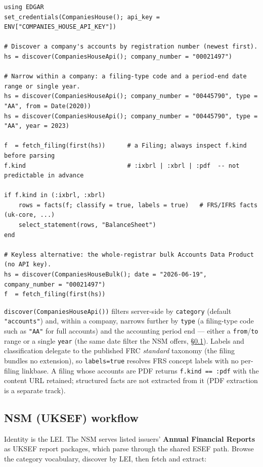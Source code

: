 \documentclass[11pt,a4paper]{report}
\begin{document}
\begin{lstlisting}
using EDGAR
set_credentials(CompaniesHouse(); api_key = ENV["COMPANIES_HOUSE_API_KEY"])

# Discover a company's accounts by registration number (newest first).
hs = discover(CompaniesHouseApi(); company_number = "00021497")

# Narrow within a company: a filing-type code and a period-end date range or single year.
hs = discover(CompaniesHouseApi(); company_number = "00445790", type = "AA", from = Date(2020))
hs = discover(CompaniesHouseApi(); company_number = "00445790", type = "AA", year = 2023)

f  = fetch_filing(first(hs))      # a Filing; always inspect f.kind before parsing
f.kind                            # :ixbrl | :xbrl | :pdf  -- not predictable in advance

if f.kind in (:ixbrl, :xbrl)
    rows = facts(f; classify = true, labels = true)   # FRS/IFRS facts (uk-core, ...)
    select_statement(rows, "BalanceSheet")
end

# Keyless alternative: the whole-registrar bulk Accounts Data Product (no API key).
hs = discover(CompaniesHouseBulk(); date = "2026-06-19", company_number = "00021497")
f  = fetch_filing(first(hs))
\end{lstlisting}

\noindent \texttt{discover(CompaniesHouseApi())} filters server-side by \texttt{category} (default
\texttt{"accounts"}) and, within a company, narrows further by \texttt{type} (a filing-type code such
as \texttt{"AA"} for full accounts) and the accounting period end --- either a \texttt{from}/\texttt{to}
range or a single \texttt{year} (the same date filter the NSM offers, \S\ref{sys:nsm}).
Labels and classification delegate to the published FRC \emph{standard} taxonomy (the
filing bundles no extension), so \texttt{labels=true} resolves FRS concept labels with no per-filing
linkbase. A filing whose accounts are PDF returns \texttt{f.kind == :pdf} with the content URL
retained; structured facts are not extracted from it (PDF extraction is a separate track).

\subsection{NSM (UKSEF) workflow}
\label{sys:nsm}

Identity is the LEI. The NSM serves listed issuers' \textbf{Annual Financial Reports} as UKSEF
report packages, which parse through the shared ESEF path. Browse the category vocabulary, discover by
LEI, then fetch and extract:
\end{document}
